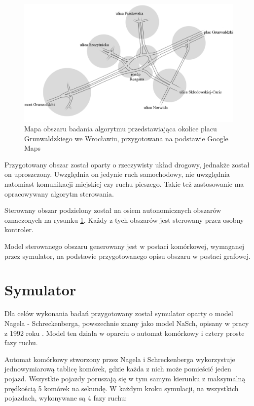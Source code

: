 \begin{figure}[h]
    \centering
    \includegraphics[width=1.0\textwidth]{images/mapa_czysta.png}
    \caption{Mapa obszaru badania algorytmu przedstawiająca okolice placu Grunwaldzkiego we Wrocławiu, przygotowana na podstawie Google Maps \cite{google_maps}}
    \label{fig:mapa_czysta}
\end{figure}

Przygotowany obszar został oparty o rzeczywisty układ drogowy, jednakże został on uproszczony. Uwzględnia on jedynie ruch samochodowy, nie uwzględnia natomiast komunikacji miejskiej czy ruchu pieszego. Takie też zastosowanie ma opracowywany algorytm sterowania.

Sterowany obszar podzielony został na osiem autonomicznych obszarów oznaczonych na rysunku \ref{fig:mapa_czysta}. Każdy z tych obszarów jest sterowany przez osobny kontroler.

Model sterowanego obszaru generowany jest w postaci komórkowej, wymaganej przez symulator, na podstawie przygotowanego opisu obszaru w postaci grafowej.

\section{Symulator}
\label{chap:symulacja}
Dla celów wykonania badań przygotowany został symulator oparty o model Nagela - Schreckenberga, powszechnie znany jako model NaSch, opisany w pracy z 1992 roku \cite{nasch}. Model ten działa w oparciu o automat komórkowy i cztery proste fazy ruchu.

Automat komórkowy stworzony przez Nagela i Schreckenberga wykorzystuje jednowymiarową tablicę komórek, gdzie każda z nich może pomieścić jeden pojazd. Wszystkie pojazdy poruszają się w tym samym kierunku z maksymalną prędkością 5 komórek na sekundę. W każdym kroku symulacji, na wszystkich pojazdach, wykonywane są 4 fazy ruchu:

